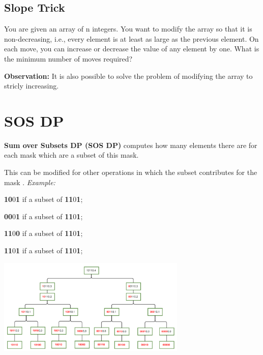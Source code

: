         

    \vspace{5pts}

    \subsection{Slope Trick}
    
    You are given an array of n integers. You want to modify the array so that it is non-decreasing, i.e., every element is at least as large as the previous element.
    On each move, you can increase or decrease the value of any element by one. What is the minimum number of moves required?
    
    \textbf{Observation: } It is also possible to solve the problem of modifying the array to stricly increasing.


\section{SOS DP}

    \textbf{Sum over Subsets DP (SOS DP)} computes how many elements there are for each mask
    which are a subset of this mask.

    This can be modified for other operations in which the subset contributes for the mask
    .
    \textit{Example:}

    \textbf{10}0\textbf{1} if a subset of \textbf{11}0\textbf{1};

    \textbf{00}0\textbf{1} if a subset of \textbf{11}0\textbf{1};
    
    \textbf{11}0\textbf{0} if a subset of \textbf{11}0\textbf{1};
    
    \textbf{11}0\textbf{1} if a subset of \textbf{11}0\textbf{1};

    \begin{center}
        \includegraphics[width=9cm]{content/dynamic-programming/sos-example.pdf}
    \end{center}

